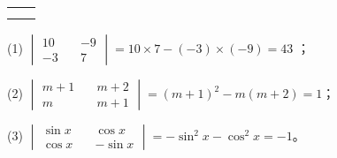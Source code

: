 \begin{xiaoxiaotis}

    \begin{tabular}[t]{*{2}{@{}p{16em}}}
         &  \\[1.5em]
    \end{tabular}

\end{xiaoxiaotis}

\jie
(1) $\begin{vmatrix}
        10  \quad & -9 \\
        -3  \quad & 7
    \end{vmatrix} = 10 \times 7 - (-3) \times (-9) = 43$ ；

(2) $\begin{vmatrix}
        m+1 \quad & m+2 \\
        m   \quad & m+1
    \end{vmatrix} = (m + 1)^2 - m(m + 2) = 1$；

(3) $\begin{vmatrix}
        \sin x \quad & \cos x \\
        \cos x \quad & -\sin x
    \end{vmatrix} = -\sin^2x - \cos^2x = -1$。


